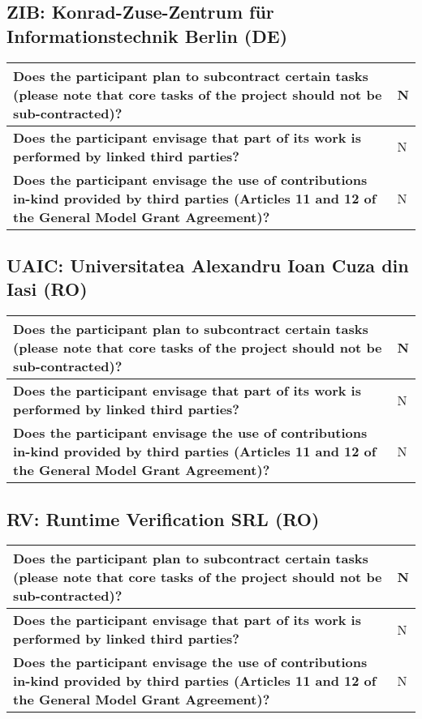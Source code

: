 \subsection*{ZIB: Konrad-Zuse-Zentrum für Informationstechnik Berlin (DE)}

\begin{longtable}{|p{}|p{}|}
\hline
{\bf Does the participant plan to subcontract certain tasks (please
  note that core tasks of the project should not be sub-contracted)?}
&
N
\\
\hline
{\bf Does the participant envisage that  part of its work is performed
  by linked third parties?}
&
N
\\
\hline
{\bf Does the participant envisage the use of contributions in-kind
provided by third parties (Articles 11 and 12 of the General Model
Grant Agreement)?}
&
N
\\
\hline
\end{longtable}


\subsection*{UAIC: Universitatea Alexandru Ioan Cuza din Iasi (RO)}

\begin{longtable}{|p{}|p{}|}
\hline
{\bf Does the participant plan to subcontract certain tasks (please
  note that core tasks of the project should not be sub-contracted)?}
&
N
\\
\hline
{\bf Does the participant envisage that  part of its work is performed
  by linked third parties?}
&
N
\\
\hline
{\bf Does the participant envisage the use of contributions in-kind
provided by third parties (Articles 11 and 12 of the General Model
Grant Agreement)?}
&
N
\\
\hline
\end{longtable}


\subsection*{RV: Runtime Verification SRL (RO)}

\begin{longtable}{|p{}|p{}|}
\hline
{\bf Does the participant plan to subcontract certain tasks (please
  note that core tasks of the project should not be sub-contracted)?}
&
N
\\
\hline
{\bf Does the participant envisage that  part of its work is performed
  by linked third parties?}
&
N
\\
\hline
{\bf Does the participant envisage the use of contributions in-kind
provided by third parties (Articles 11 and 12 of the General Model
Grant Agreement)?}
&
N
\\
\hline
\end{longtable}










